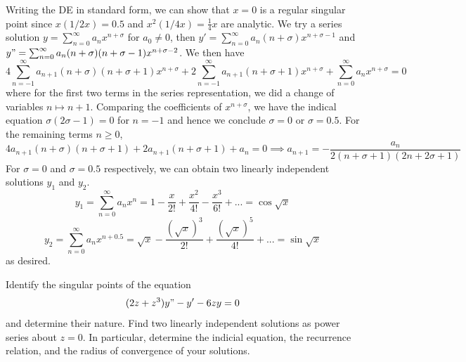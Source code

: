 \documentclass[a4paper]{article}
\begin{document}
\begin{ans}
Writing the DE in standard form, we can show that $x=0$ is a regular singular point since $x(1/2x)=0.5$ and $x^2(1/4x)=\frac{1}{4}x$ are analytic. We try a series solution $y=\sum_{n=0}^\infty a_nx^{n+\sigma}$ for $a_0\neq 0$, then $y'=\sum_{n=0}^\infty a_n(n+\sigma)x^{n+\sigma -1}$ and $y"=\sum_{n=0}^\infty a_n(n+\sigma)(n+\sigma-1)x^{n+\sigma-2}$. We then have
$$4\sum_{n=-1}^\infty a_{n+1}(n+\sigma)(n+\sigma+1)x^{n+\sigma}+2\sum_{n=-1}^\infty a_{n+1}(n+\sigma+1)x^{n+\sigma}+\sum_{n=0}^\infty a_nx^{n+\sigma}=0$$
where for the first two terms in the series representation, we did a change of variables $n\mapsto n+1$. Comparing the coefficients of $x^{n+\sigma}$, we have the indical equation $\sigma(2\sigma-1)=0$ for $n=-1$ and hence we conclude $\sigma=0$ or $\sigma=0.5$. For the remaining terms $n\geq0$,
$$4a_{n+1}(n+\sigma)(n+\sigma+1)+2a_{n+1}(n+\sigma+1)+a_n=0\implies a_{n+1}=-\frac{a_n}{2(n+\sigma+1)(2n+2\sigma+1)}$$
For $\sigma=0$ and $\sigma=0.5$ respectively, we can obtain two linearly independent solutions $y_1$ and $y_2$.
$$y_1=\sum_{n=0}^\infty a_nx^n=1-\frac{x}{2!}+\frac{x^2}{4!}-\frac{x^3}{6!}+...=\cos\sqrt{x}$$
$$y_2=\sum_{n=0}^\infty a_nx^{n+0.5}=\sqrt{x}-\frac{(\sqrt{x})^3}{2!}+\frac{(\sqrt{x})^5}{4!}+...=\sin\sqrt{x}$$
as desired.
\end{ans}
\newpage
\begin{qns}
Identify the singular points of the equation
$$(2z+z^3)y"-y'-6zy=0$$
and determine their nature. Find two linearly independent solutions as power series about $z = 0$. In particular, determine the indicial equation, the recurrence relation, and the radius of convergence of your solutions.
\end{qns}
\end{document}
